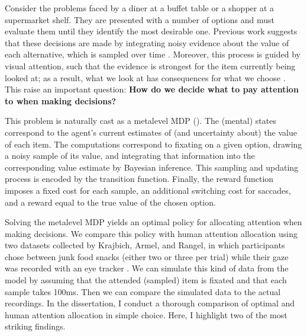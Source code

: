 \documentclass[11pt,a4paperpaper,]{article}
\begin{document}
Consider the problems faced by a diner at a buffet table or a shopper at a supermarket shelf. They are presented with a number of options and must evaluate them until they identify the most desirable one. Previous work suggests that these decisions are made by integrating noisy evidence about the value of each alternative, which is sampled over time \citep{ratcliff2008diffusion,milosavljevic2010drift,usher2001time}. Moreover, this process is guided by visual attention, such that the evidence is strongest for the item currently being looked at; as a result, what we look at has consequences for what we choose \citep{shimojo2003gaze,armel2008biasing,krajbich2010visual}. This raise an important question: \textbf{How do we decide what to pay attention to when making decisions?}

This problem is naturally cast as a metalevel MDP (). The (mental) states correspond to the agent's current estimates of (and uncertainty about) the value of each item. The computations correspond to fixating on a given option, drawing a noisy sample of its value, and integrating that information into the corresponding value estimate by Bayesian inference. This sampling and updating process is encoded by the transition function. Finally, the reward function imposes a fixed cost for each sample, an additional switching cost for saccades, and a reward equal to the true value of the chosen option.

Solving the metalevel MDP yields an optimal policy for allocating attention when making decisions. We compare this policy with human attention allocation using two datasets collected by Krajbich, Armel, and Rangel, in which participants chose between junk food snacks (either two or three per trial) while their gaze was recorded with an eye tracker \citep{krajbich2010visual,krajbich2011multialternative}. We can simulate this kind of data from the model by assuming that the attended (sampled) item is fixated and that each sample takes 100ms. Then we can compare the simulated data to the actual recordings. In the dissertation, I conduct a thorough comparison of optimal and human attention allocation in simple choice. Here, I highlight two of the most striking findings.

\end{document}
